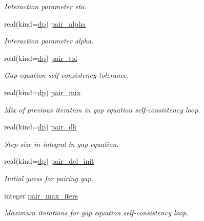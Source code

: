 \begin{DoxyCompactItemize}
\begin{DoxyCompactList}\small\item\em Interaction parameter eta. \end{DoxyCompactList}\item 
real(kind=\mbox{\hyperlink{namespaceparameters_a52f8c6351fd79345d8811e065bcbbb37}{dp}}) \mbox{\hyperlink{group__INPUT__PARS_gaa3116e010e1f1435881ad489d7ea5dad}{pair\+\_\+alpha}}
\begin{DoxyCompactList}\small\item\em Interaction parameter alpha. \end{DoxyCompactList}\item 
real(kind=\mbox{\hyperlink{namespaceparameters_a52f8c6351fd79345d8811e065bcbbb37}{dp}}) \mbox{\hyperlink{group__INPUT__PARS_ga9b9d6d0cf64fa6e7f9dd00f5b15848bd}{pair\+\_\+tol}}
\begin{DoxyCompactList}\small\item\em Gap equation self-\/consistency tolerance. \end{DoxyCompactList}\item 
real(kind=\mbox{\hyperlink{namespaceparameters_a52f8c6351fd79345d8811e065bcbbb37}{dp}}) \mbox{\hyperlink{group__INPUT__PARS_ga6fdafa171f65aa7236a9c76ebaab4d08}{pair\+\_\+mix}}
\begin{DoxyCompactList}\small\item\em Mix of previous iteration in gap equation self-\/consistency loop. \end{DoxyCompactList}\item 
real(kind=\mbox{\hyperlink{namespaceparameters_a52f8c6351fd79345d8811e065bcbbb37}{dp}}) \mbox{\hyperlink{group__INPUT__PARS_ga1c083bc7a4e3979327020ec3e1509220}{pair\+\_\+dk}}
\begin{DoxyCompactList}\small\item\em Step size in integral in gap equation. \end{DoxyCompactList}\item 
real(kind=\mbox{\hyperlink{namespaceparameters_a52f8c6351fd79345d8811e065bcbbb37}{dp}}) \mbox{\hyperlink{group__INPUT__PARS_ga9fe26afec63d3ebfb7900ccc330779d0}{pair\+\_\+del\+\_\+init}}
\begin{DoxyCompactList}\small\item\em Initial guess for pairing gap. \end{DoxyCompactList}\item 
integer \mbox{\hyperlink{group__INPUT__PARS_gafef003bd348d08faadb13f56378b8e4c}{pair\+\_\+max\+\_\+iters}}
\begin{DoxyCompactList}\small\item\em Maximum iterations for gap equation self-\/consistency loop. \end{DoxyCompactList}\item 

\end{DoxyCompactItemize}
